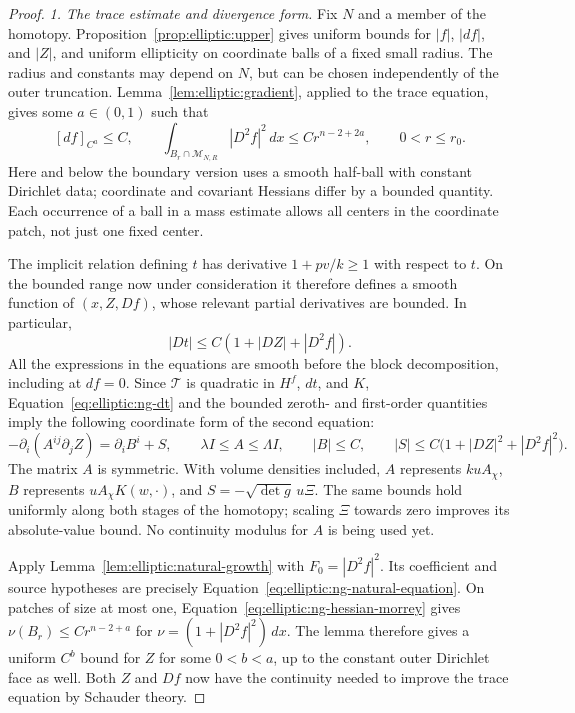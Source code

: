 \begin{proof}
\medskip\noindent\emph{1. The trace estimate and divergence form.}
Fix $N$ and a member of the homotopy.  Proposition~\ref{prop:elliptic:upper} gives
uniform bounds for $|f|$, $|df|$, and $|Z|$, and uniform ellipticity on
coordinate balls of a fixed small radius.  The radius and constants may
depend on $N$, but can be chosen independently of the outer truncation.
Lemma~\ref{lem:elliptic:gradient}, applied to the trace equation, gives some
$a\in(0,1)$ such that
\begin{equation}\label{eq:elliptic:ng-hessian-morrey}
 [df]_{C^a}\le C,
 \qquad
 \int_{B_r\cap\mathcal M_{N,R}}|D^2f|^2\,dx
       \le C r^{n-2+2a},\qquad 0<r\le r_0.
\end{equation}
Here and below the boundary version uses a smooth half-ball with constant
Dirichlet data; coordinate and covariant Hessians differ by a bounded
quantity.  Each occurrence of a ball in a mass estimate allows all
centers in the coordinate patch, not just one fixed center.

The implicit relation defining $t$ has derivative
$1+pv/k\ge1$ with respect to $t$.  On the bounded range now under
consideration it therefore defines a smooth function of $(x,Z,Df)$,
whose relevant partial derivatives are bounded.  In particular,
\begin{equation}\label{eq:elliptic:ng-dt}
 |Dt|\le C(1+|DZ|+|D^2f|).
\end{equation}
All the expressions in the equations are smooth before the block
decomposition, including at $df=0$.  Since $\mathcal T$ is quadratic
in $H^f$, $dt$, and $K$, Equation~\eqref{eq:elliptic:ng-dt} and the bounded
zeroth- and first-order quantities imply the following coordinate form
of the second equation:
\begin{equation}\label{eq:elliptic:ng-natural-equation}
 -\partial_i(A^{ij}\partial_j Z)=\partial_i B^i+S,
 \qquad
 \lambda I\le A\le\Lambda I,
 \qquad |B|\le C,
 \qquad |S|\le C\bigl(1+|DZ|^2+|D^2f|^2\bigr).
\end{equation}
The matrix $A$ is symmetric.  With volume densities included,
$A$ represents $kuA_\chi$, $B$ represents $uA_\chi K(w,\cdot)$,
and $S=-\sqrt{\det g}\,u\Xi$.  The same bounds hold uniformly along
both stages of the homotopy; scaling $\Xi$ towards zero improves its
absolute-value bound.  No continuity modulus for $A$ is being used yet.

Apply Lemma~\ref{lem:elliptic:natural-growth} with
$F_0=|D^2f|^2$.  Its coefficient and source hypotheses are precisely
Equation~\eqref{eq:elliptic:ng-natural-equation}.  On patches of size
at most one, Equation~\eqref{eq:elliptic:ng-hessian-morrey} gives
$\nu(B_r)\le Cr^{n-2+a}$ for
$\nu=(1+|D^2f|^2)\,dx$.  The lemma therefore gives a uniform
$C^b$ bound for $Z$ for some $0<b<a$, up to the constant outer
Dirichlet face as well.  Both $Z$ and $Df$ now have the continuity
needed to improve the trace equation by Schauder theory.


\end{proof}
